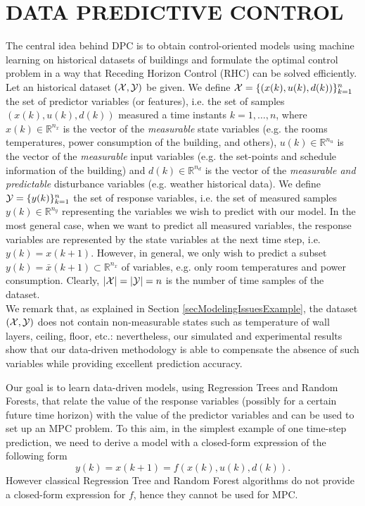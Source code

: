 \section{DATA PREDICTIVE CONTROL}

\label{S:dpc}



\textcolor[rgb]{0,0,1}{The central idea behind DPC is to obtain control-oriented models using machine learning on historical datasets of buildings and formulate the optimal control problem in a way that Receding Horizon Control (RHC) can be solved efficiently. Let an historical dataset $(\mathcal{X},\mathcal{Y})$ be given.
We define $\mathcal{X} = \{(x(k),u(k),d(k))\}_{k=1}^n$ the set of predictor variables (or features), i.e. the set of samples $(x(k),u(k),d(k))$ measured a time instants $k=1,\ldots,n$, where $x(k)\in\mathbb{R}^{n_x}$ is the vector of the \emph{measurable} state variables (e.g. the rooms temperatures, power consumption of the building, and others), $u(k)\in\mathbb{R}^{n_u}$ is the vector of the \emph{measurable} input variables (e.g. the set-points and schedule information of the building) and $d(k)\in\mathbb{R}^{n_d}$ is the vector of the \emph{measurable and predictable} disturbance variables (e.g. weather historical data).
We define $\mathcal{Y} = \{y(k)\}_{k=1}^{n}$ the set of response variables, i.e. the set of measured samples $y(k)\in\mathbb{R}^{n_y}$ representing the variables we wish to predict with our model. In the most general case, when we want to predict all measured variables, the response variables are represented by the state variables at the next time step, i.e. $y(k) = x(k+1)$. However, in general, we only wish to predict a subset $y(k) = \bar x(k+1) \subset \mathbb{R}^{n_x}$ of variables, e.g. only room temperatures and power consumption.
Clearly, $|\mathcal{X}| = |\mathcal{Y}| = n$ is the number of time samples of the dataset.\\
We remark that, as explained in Section \ref{secModelingIssuesExample}, the dataset $(\mathcal{X},\mathcal{Y})$ does not contain non-measurable states such as temperature of wall layers, ceiling, floor, etc.: nevertheless, our simulated and experimental results show that our data-driven methodology is able to compensate the absence of such variables while providing excellent prediction accuracy.}



\textcolor[rgb]{0,0,1}{Our goal is to learn data-driven models, using Regression Trees and Random Forests, that relate the value of the response variables (possibly for a certain future time horizon) with the value of the predictor variables and can be used to set up an MPC problem. To this aim, in the simplest example of one time-step prediction, we need to derive a model with a closed-form expression of the following form
\begin{equation}\label{E:GenericModel}
	y(k)=x(k+1)=f(x(k),u(k),d(k)).
\end{equation}
However classical Regression Tree and Random Forest algorithms do not provide a closed-form expression for $f$, hence they cannot be used for MPC.}

